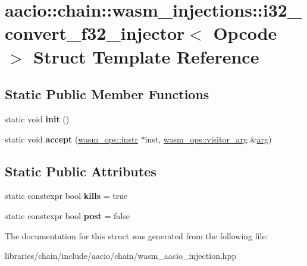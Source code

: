 \hypertarget{structaacio_1_1chain_1_1wasm__injections_1_1i32__convert__f32__injector}{}\section{aacio\+:\+:chain\+:\+:wasm\+\_\+injections\+:\+:i32\+\_\+convert\+\_\+f32\+\_\+injector$<$ Opcode $>$ Struct Template Reference}
\label{structaacio_1_1chain_1_1wasm__injections_1_1i32__convert__f32__injector}
\subsection*{Static Public Member Functions}
\begin{DoxyCompactItemize}
\item 
\mbox{\label{structaacio_1_1chain_1_1wasm__injections_1_1i32__convert__f32__injector_a894f0519d2c7269b282b09fdacddb560}} 
static void {\bfseries init} ()
\item 
\mbox{\label{structaacio_1_1chain_1_1wasm__injections_1_1i32__convert__f32__injector_a2176bb78717447d940b1b377d220a1de}} 
static void {\bfseries accept} (\mbox{\hyperlink{structaacio_1_1chain_1_1wasm__ops_1_1instr}{wasm\+\_\+ops\+::instr}} $\ast$inst, \mbox{\hyperlink{structaacio_1_1chain_1_1wasm__ops_1_1visitor__arg}{wasm\+\_\+ops\+::visitor\+\_\+arg}} \&\mbox{\hyperlink{unionarg}{arg}})
\end{DoxyCompactItemize}
\subsection*{Static Public Attributes}
\begin{DoxyCompactItemize}
\item 
\mbox{\label{structaacio_1_1chain_1_1wasm__injections_1_1i32__convert__f32__injector_a1a670fc7b17a384cc85f3352a6d66249}} 
static constexpr bool {\bfseries kills} = true
\item 
\mbox{\label{structaacio_1_1chain_1_1wasm__injections_1_1i32__convert__f32__injector_a361e79f7ccd2c654872cc9197422c056}} 
static constexpr bool {\bfseries post} = false
\end{DoxyCompactItemize}


The documentation for this struct was generated from the following file\+:\begin{DoxyCompactItemize}
\item 
libraries/chain/include/aacio/chain/wasm\+\_\+aacio\+\_\+injection.\+hpp\end{DoxyCompactItemize}
